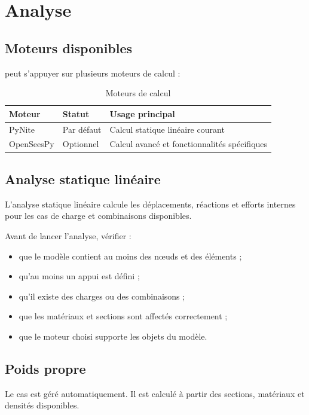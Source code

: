 \chapter{Analyse}

\section{Moteurs disponibles}

\logiciel{} peut s'appuyer sur plusieurs moteurs de calcul :

\begin{table}[H]
  \centering
  \begin{tabular}{lll}
    \toprule
    Moteur & Statut & Usage principal \\
    \midrule
    PyNite & Par défaut & Calcul statique linéaire courant \\
    OpenSeesPy & Optionnel & Calcul avancé et fonctionnalités spécifiques \\
    \bottomrule
  \end{tabular}
  \caption{Moteurs de calcul}
\end{table}

\section{Analyse statique linéaire}

L'analyse statique linéaire calcule les déplacements, réactions et efforts
internes pour les cas de charge et combinaisons disponibles.

Avant de lancer l'analyse, vérifier :

\begin{itemize}
  \item que le modèle contient au moins des nœuds et des éléments ;
  \item qu'au moins un appui est défini ;
  \item qu'il existe des charges ou des combinaisons ;
  \item que les matériaux et sections sont affectés correctement ;
  \item que le moteur choisi supporte les objets du modèle.
\end{itemize}

\section{Poids propre}

Le cas  est géré automatiquement. Il est calculé à partir
des sections, matériaux et densités disponibles.

